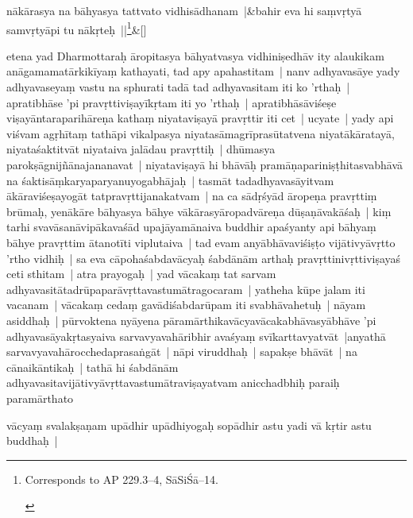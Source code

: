 \documentclass[article,a4paper]{memoir}
\newcommand{\persName}[1]{#1}
\begin{document}
	    
	    \stanza[\smallbreak]
nā\-kā\-rasya na bā\-hyasya tattvato vidhisā\-dhanam |&bahir eva hi saṃvṛtyā\- samvṛtyā\-pi tu nā\-kṛteḥ ||\footnote{\begin{english}Corresponds to AP 229.3–4, Sā\-SiŚā–14.\end{english}}\&[\smallbreak]


	

	  \pstart etena yad \persName{Dharmottaraḥ} ā\-ropitasya bā\-hyatvasya vidhiniṣedhā\-v ity alaukikam anā\-gamamatā\-rkikī\-yaṃ kathayati, tad apy apahastitam | \label{thakur75-65.26} nanv adhyavasā\-ye yady adhyavaseyaṃ vastu na sphurati tadā\- tad adhyavasitam iti ko 'rthaḥ | apratibhā\-se 'pi pravṛttiviṣayī\-kṛtam iti yo 'rthaḥ | apratibhā\-sā\-viśeṣe viṣayā\-ntaraparihā\-reṇa kathaṃ niyataviṣayā\- pravṛttir iti cet | ucyate | yady api viśvam agṛhī\-taṃ tathā\-pi vikalpasya niyatasā\-magrī\-prasū\-tatvena niyatā\-kā\-ratayā\-, niyataśaktitvā\-t niyataiva jalā\-dau pravṛttiḥ | dhū\-masya parokṣā\-gnijñā\-najananavat | \label{thakur75-66.1} niyataviṣayā\- hi bhā\-vā\-ḥ pramā\-ṇapariniṣṭhitasvabhā\-vā\- na śaktisā\-ṃkaryaparyanuyogabhā\-jaḥ | tasmā\-t tadadhyavasā\-yitvam ā\-kā\-raviśeṣayogā\-t tatpravṛttijanakatvam | na ca sā\-dṛśyā\-d ā\-ropeṇa pravṛttiṃ brū\-maḥ, yenā\-kā\-re bā\-hyasya bā\-hye vā\-kā\-rasyā\-ropadvā\-reṇa dū\-ṣaṇā\-vakā\-śaḥ | kiṃ tarhi svavā\-sanā\-vipā\-kavaśā\-d upajā\-yamā\-naiva buddhir apaśyanty api bā\-hyaṃ bā\-hye pravṛttim ā\-tanotī\-ti viplutaiva | tad evam anyā\-bhā\-vaviśiṣṭo vijā\-tivyā\-vṛtto 'rtho vidhiḥ | sa eva cā\-pohaśabdavā\-cyaḥ śabdā\-nā\-m arthaḥ pravṛttinivṛttiviṣayaś ceti sthitam | \label{thakur75-66.8} atra prayogaḥ | yad vā\-cakaṃ tat sarvam adhyavasitā\-tadrū\-paparā\-vṛttavastumā\-tragocaram | yatheha kū\-pe jalam iti vacanam | vā\-cakaṃ cedaṃ gavā\-diśabdarū\-pam iti svabhā\-vahetuḥ | nā\-yam asiddhaḥ | pū\-rvoktena nyā\-yena pā\-ramā\-rthikavā\-cyavā\-cakabhā\-vasyā\-bhā\-ve 'pi adhyavasā\-yakṛtasyaiva sarvavyavahā\-ribhir avaśyaṃ svī\-karttavyatvā\-t |anyathā\- sarvavyavahā\-rocchedaprasaṅgā\-t | nā\-pi viruddhaḥ | sapakṣe bhā\-vā\-t | na cā\-naikā\-ntikaḥ | tathā\- hi śabdā\-nā\-m adhyavasitavijā\-tivyā\-vṛttavastumā\-traviṣayatvam anicchadbhiḥ paraiḥ paramā\-rthato
	\pend
      

	  \pstart vā\-cyaṃ svalakṣaṇam upā\-dhir upā\-dhiyogaḥ sopā\-dhir astu yadi vā\- kṛtir astu buddhaḥ |
	\pend
      
\end{document}
